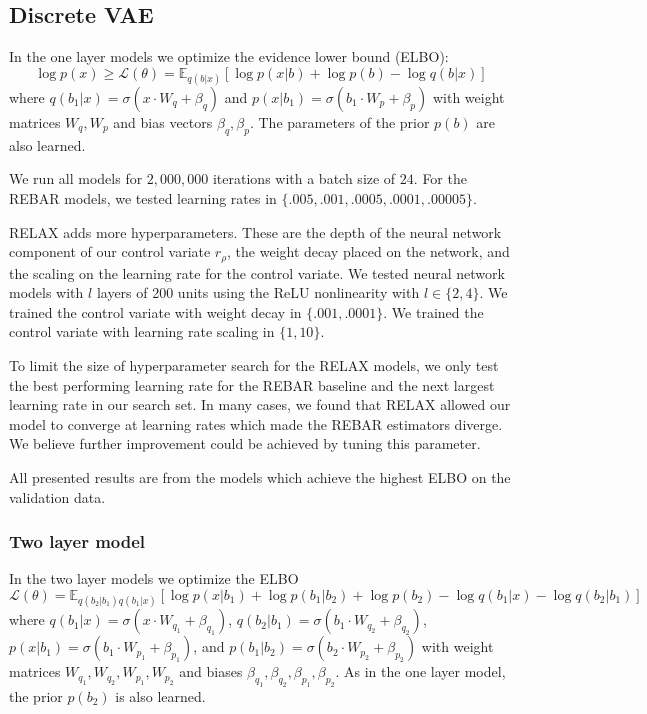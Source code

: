 \documentclass{article}
\newcommand{\E}{\mathbb{E}}
\begin{document}
\subsection{Discrete VAE}
\label{app_disc_vae}
In the one layer models we optimize the evidence lower bound (ELBO): $$\log p(x) \geq \mathcal{L}(\theta) = \E_{q(b|x)}[\log p(x|b) + \log p(b) - \log q(b|x)]$$ where $q(b_1|x) = \sigma(x\cdot W_q + \beta_q)$ and $p(x| b_1) = \sigma(b_1\cdot W_p + \beta_p)$ with weight matrices $W_q,W_p$ and bias vectors $\beta_q,\beta_p$.
The parameters of the prior $p(b)$ are also learned.

We run all models for $2,000,000$ iterations with a batch size of $24$. For the REBAR models, we tested learning rates in $\{.005, .001, .0005,  .0001, .00005\}$. 

RELAX adds more hyperparameters.
These are the depth of the neural network component of our control variate $r_\rho$, the weight decay placed on the network, and the scaling on the learning rate for the control variate.
We tested neural network models with $l$ layers of 200 units using the ReLU nonlinearity with $l \in \{2, 4\}$.
We trained the control variate with weight decay in $\{.001, .0001\}$. We trained the control variate with learning rate scaling in $\{1, 10\}$.

To limit the size of hyperparameter search for the RELAX models, we only test the best performing learning rate for the REBAR baseline and the next largest learning rate in our search set.
In many cases, we found that RELAX allowed our model to converge at learning rates which made the REBAR estimators diverge.
We believe further improvement could be achieved by tuning this parameter.

All presented results are from the models which achieve the highest ELBO on the validation data.

\subsubsection{Two layer model}
In the two layer models we optimize the ELBO $$\mathcal{L}(\theta) = \E_{q(b_2|b_1)q(b_1|x)}[\log p(x|b_1) + \log p(b_1|b_2) + \log p(b_2) - \log q(b_1|x) - \log q(b_2|b_1)]$$ where $q(b_1|x) = \sigma(x\cdot W_{q_1} + \beta_{q_1})$, $q(b_2|b_1) = \sigma(b_1\cdot W_{q_2} + \beta_{q_2})$, $p(x| b_1) = \sigma(b_1\cdot W_{p_1} + \beta_{p_1})$, and $p(b_1| b_2) = \sigma(b_2\cdot W_{p_2} + \beta_{p_2})$ with weight matrices $W_{q_1},W_{q_2},W_{p_1},W_{p_2}$ and biases $\beta_{q_1},\beta_{q_2},\beta_{p_1},\beta_{p_2}$. As in the one layer model, the prior $p(b_2)$ is also learned.
\end{document}
